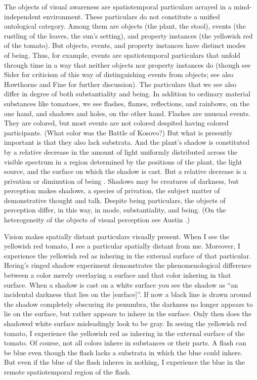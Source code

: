 \documentclass[12pt]{article}
\begin{document}
The objects of visual awareness are spatiotemporal particulars arrayed in a mind-independent environment. These particulars do not constitute a unified ontological category. Among them are objects (the plant, the stool), events (the rustling of the leaves, the sun's setting), and property instances (the yellowish red of the tomato). But objects, events, and property instances have distinct modes of being. Thus, for example, events are spatiotemporal particulars that unfold through time in a way that neither objects nor property instances do (though see Sider \citeyear{Sider:1997fk} for criticism of this way of distinguishing events from objects; see also Hawthorne \citeyear{Hawthorne:2008uq} and Fine \citeyear{Fine:2006fk} for further discussion). The particulars that we see also differ in degree of both substantiality and being. In addition to ordinary material substances like tomatoes, we see flashes, flames, reflections, and rainbows, on the one hand, and shadows and holes, on the other hand. Flashes are unusual events. They are colored, but most events are not colored despited having colored participants. (What color was the Battle of Kosovo?) But what is presently important is that they also lack substrata. And the plant's shadow is constituted by a relative decrease in the amount of light uniformly distributed across the visible spectrum in a region determined by the positions of the plant, the light source, and the surface on which the shadow is cast. But a relative decrease is a privation or diminution of being \citep[see][]{Sorensen:2008kx}. Shadows may be creatures of darkness, but perception makes shadows, a species of privation, the subject matter of demonstrative thought and talk. Despite being particulars, the objects of perception differ, in this way, in mode, substantiality, and being. (On the heterogeneity of the objects of visual perception see Austin \citeyear{Austin:1962lr}.)

Vision makes spatially distant particulars visually present. When I see the yellowish red tomato, I see a particular spatially distant from me. Moreover, I experience the yellowish red as inhering in the external surface of that particular. Hering's \citeyearpar[8]{Hering:1920ty} ringed shadow experiment demonstrates the phenomenological difference between a color merely overlaying a surface and that color inhering in that surface. When a shadow is cast on a white surface you see the shadow as ``an incidental darkness that lies on the [surface]''. If now a black line is drawn around the shadow completely obscuring its penumbra, the darkness no longer appears to lie on the surface, but rather appears to inhere in the surface. Only then does the shadowed white surface misleadingly look to be gray. In seeing the yellowish red tomato, I experience the yellowish red as inhering in the external surface of the tomato. Of course, not all colors inhere in substances or their parts. A flash can be blue even though the flash lacks a substrata in which the blue could inhere. But even if the blue of the flash inheres in nothing, I experience the blue in the remote spatiotemporal region of the flash. 
\end{document}
